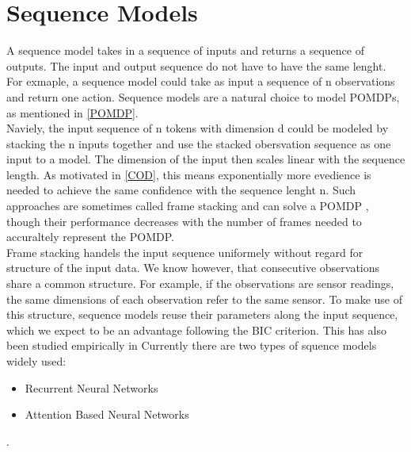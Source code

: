 \section{Sequence Models}
A sequence model takes in a sequence of inputs and returns a sequence of outputs. The input and output sequence do not have to have the same lenght. For exmaple, 
a sequence model could take as input a sequence of n observations and return one action. Sequence models are a natural choice to model POMDPs, as mentioned in 
\ref{POMDP}.\\ 
Naviely, the input sequence of n tokens with dimension d could be modeled by stacking the n inputs together and use the stacked obersvation sequence as one 
input to a model. The dimension of the input then scales linear with the sequence length. As motivated in \ref{COD}, this means exponentially more evedience is 
needed to achieve the same confidence with the sequence lenght n. Such approaches are sometimes called frame stacking and can solve a POMDP 
\cite{https://wandb.ai/sb3/no-vel-envs/reports/PPO-vs-RecurrentPPO-aka-PPO-LSTM-on-environments-with-masked-velocity-SB3-Contrib---VmlldzoxOTI4NjE4}, though 
their performance decreases with the number of frames needed to accuraltely represent the POMDP. \\
Frame stacking handels the input sequence uniformely without regard for structure of the input data. We know however, that consecutive observations share a common 
structure. For example, if the observations are sensor readings, the same dimensions of each observation refer to the same sensor. To make use of this structure, 
sequence models reuse their parameters along the input sequence, which we expect to be an advantage following the BIC criterion. This has also been studied empirically in %
Currently there are two types of squence models widely used:
\begin{itemize}
    \item Recurrent Neural Networks
    \item Attention Based Neural Networks
\end{itemize}
.

